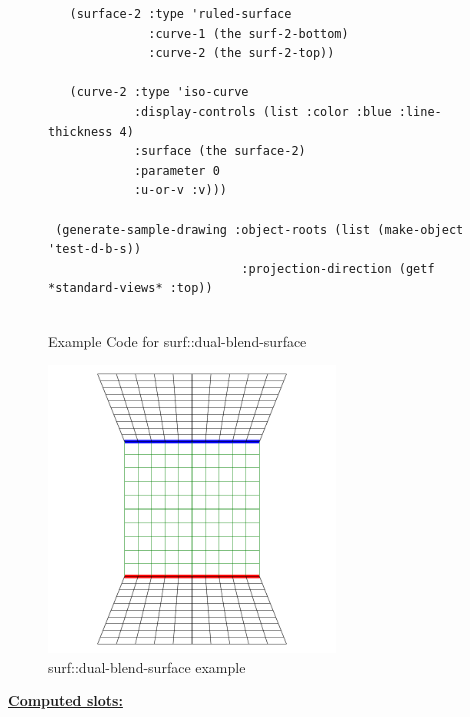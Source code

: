 \documentclass [11pt]{book}
\begin{document}
\begin{itemize}
\begin{figure}
\begin{lrbox}{\boxedverb}
\begin{minipage}{\linewidth}
{\begin{verbatim}
   (surface-2 :type 'ruled-surface
              :curve-1 (the surf-2-bottom)
              :curve-2 (the surf-2-top))
    
   (curve-2 :type 'iso-curve
            :display-controls (list :color :blue :line-thickness 4)
            :surface (the surface-2)
            :parameter 0
            :u-or-v :v)))

 (generate-sample-drawing :object-roots (list (make-object 'test-d-b-s))
                           :projection-direction (getf *standard-views* :top))
 
\end{verbatim}}
\end{minipage}
\end{lrbox}
\fbox{\usebox{\boxedverb}}

\caption{Example Code for surf::dual-blend-surface}

\label{fig:example-code-surf::dual-blend-surface}

\end{figure}

\begin{figure}
\begin{center}
\includegraphics[width=3in,height=3in]{../images/example-surf::dual-blend-surface.pdf}
\end{center}

\caption{surf::dual-blend-surface example}

\label{fig:surf::dual-blend-surface}

\end{figure}





\textbf{
\underline{Computed slots:}}

\begin{description}


\end{description}
\end{itemize}
\end{document}
